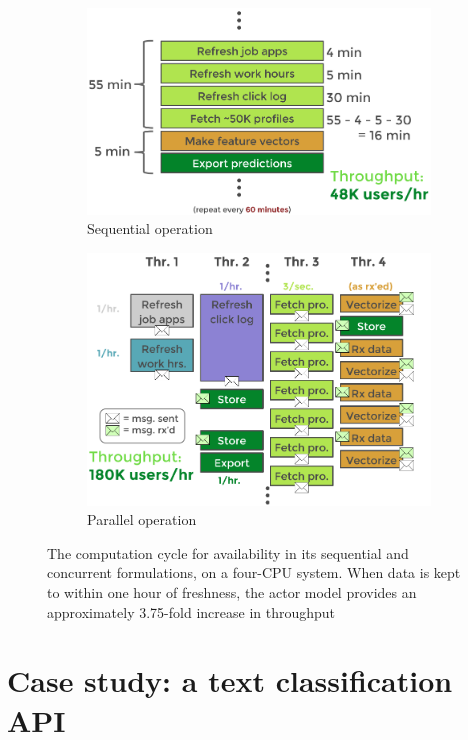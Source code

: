 \documentclass{article}
\begin{document}
\begin{figure}
\begin{subfigure}{.5\textwidth}
	\centering
	\includegraphics[width=.95\linewidth]{fig/tex/availability_serial.png}
	\caption{Sequential operation}
	\label{fig_avail_serial}
\end{subfigure}
\begin{subfigure}{.5\textwidth}
	\centering
	\includegraphics[width=.95\linewidth]{fig/tex/availability_concurrent.png}
	\caption{Parallel operation}
	\label{fig_avail_concur}
	\end{subfigure}
\caption{The computation cycle for availability in its sequential and concurrent
formulations, on a four-CPU system. When data is kept to within one hour of
freshness, the actor model provides an approximately 3.75-fold increase in
throughput}
\label{fig:fig}
\end{figure}

\section{Case study: a text classification API}
\end{document}

